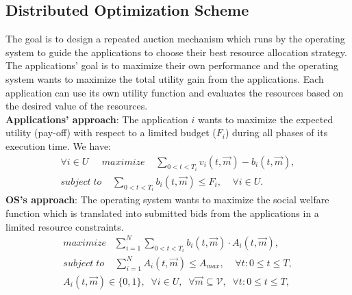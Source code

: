 \subsection{Distributed Optimization Scheme}
The goal is to design a repeated auction mechanism which runs by the operating system to guide the applications to choose their best resource allocation strategy. The applications' goal is to maximize their own performance and the operating system wants to maximize the total utility gain from the applications. Each application can use its own utility function and evaluates the resources based on the desired value of the resources. \\
\indent \textbf{Applications' approach}: The application $i$ wants to maximize the expected utility (pay-off) with respect to a limited budget ($F_i$) during all phases of its execution time. We have:
\begin{align}
\forall i \in U \; \; \; \; \; maximize \; \; \; \; \sum\limits_{0<t<T_i} v_{i}(t,\vec{m})-b_{i}(t,\vec{m}) , \nonumber \\
subject \; to \;\;\;\; \sum\limits_{0<t<T_i} b_{i}(t,\vec{m}) \leq F_i, \; \; \; \; \forall i \in U.
\end{align}
\indent \textbf{OS's approach}: The operating system wants to maximize the social welfare function which is translated into submitted bids from the applications in a limited resource constraints.
\vspace{-0.5\baselineskip}
\begin{align}
maximize \; \; \; \sum\limits_{i=1}^N \sum\limits_{0<t<T_i}  b_{i}(t,\vec{m}) \cdot A_{i}(t, \vec{m}) , \nonumber \\ 
subject \; to \;\;\;\; \sum\limits_{i=1}^N  A_{i}(t, \vec{m}) \leq A_{max}, \; \; \; \; \forall t: 0 \leq t \leq T , \nonumber \\
A_{i}(t, \vec{m}) \in \{0,1\} , \; \; \forall i \in U, \; \;  \forall \vec{m} \subseteq \mathcal{V}, \; \;  \forall t:  0 \leq t \leq T ,
\end{align}
